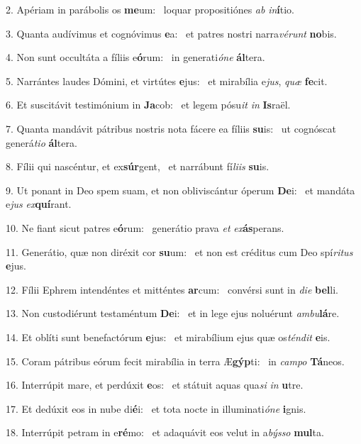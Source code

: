 2. Apériam in parábolis os \textbf{me}um: \ast\  loquar propositiónes \textit{ab} \textit{in}\textbf{í}tio.\

3. Quanta audívimus et cognóvimus \textbf{e}a: \ast\  et patres nostri narra\textit{vé}\textit{runt} \textbf{no}bis.\

4. Non sunt occultáta a fíliis e\textbf{ó}rum: \ast\  in generati\textit{ó}\textit{ne} \textbf{ál}tera.\

5. Narrántes laudes Dómini, et virtútes \textbf{e}jus: \ast\  et mirabília e\textit{jus}, \textit{quæ} \textbf{fe}cit.\

6. Et suscitávit testimónium in \textbf{Ja}cob: \ast\  et legem pósu\textit{it} \textit{in} \textbf{Is}raël.\

7. Quanta mandávit pátribus nostris nota fácere ea fíliis \textbf{su}is: \ast\  ut cognóscat generá\textit{ti}\textit{o} \textbf{ál}tera.\

8. Fílii qui nascéntur, et ex\textbf{súr}gent, \ast\  et narrábunt fí\textit{li}\textit{is} \textbf{su}is.\

9. Ut ponant in Deo spem suam, et non obliviscántur óperum \textbf{De}i: \ast\  et mandáta e\textit{jus} \textit{ex}\textbf{quí}rant.\

10. Ne fiant sicut patres e\textbf{ó}rum: \ast\  generátio prava \textit{et} \textit{ex}\textbf{ás}perans.\

11. Generátio, quæ non diréxit cor \textbf{su}um: \ast\  et non est créditus cum Deo spí\textit{ri}\textit{tus} \textbf{e}jus.\

12. Fílii Ephrem intendéntes et mitténtes \textbf{ar}cum: \ast\  convérsi sunt in \textit{di}\textit{e} \textbf{bel}li.\

13. Non custodiérunt testaméntum \textbf{De}i: \ast\  et in lege ejus noluérunt \textit{am}\textit{bu}\textbf{lá}re.\

14. Et oblíti sunt benefactórum \textbf{e}jus: \ast\  et mirabílium ejus quæ os\textit{tén}\textit{dit} \textbf{e}is.\

15. Coram pátribus eórum fecit mirabília in terra Æ\textbf{gýp}ti: \ast\  in \textit{cam}\textit{po} \textbf{Tá}neos.\

16. Interrúpit mare, et perdúxit \textbf{e}os: \ast\  et státuit aquas qua\textit{si} \textit{in} \textbf{u}tre.\

17. Et dedúxit eos in nube di\textbf{é}i: \ast\  et tota nocte in illuminati\textit{ó}\textit{ne} \textbf{i}gnis.\

18. Interrúpit petram in e\textbf{ré}mo: \ast\  et adaquávit eos velut in a\textit{býs}\textit{so} \textbf{mul}ta.\

